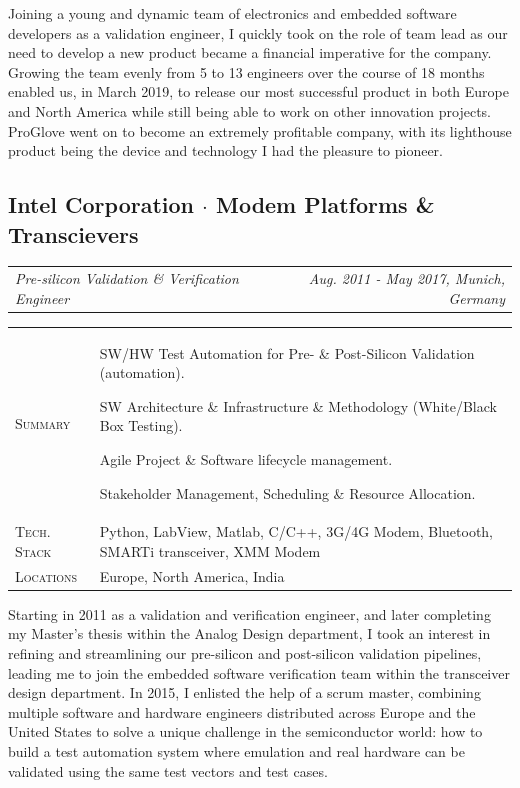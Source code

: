 \documentclass[10pt,a4paper]{moderncv}
\newcommand*{\makecareersubsection}[5]{
  \vspace{0.75em}
  \subsection{#1 {\color{color2}$\cdot$ #2}}
  \addvspace{-0.2em}
  {
    \color{color2}
    \begin{tabularx}{\textwidth}{LR}
      {\itshape #3} & {\itshape #4, #5}
    \end{tabularx}\par
  }
  \addvspace{1.25em}
  }
\begin{document}
  \begin{minipage}{\textwidth}
    \small
    Joining a young and dynamic team of electronics and embedded software developers as a validation engineer, I quickly took on the role of team lead as our need to develop a new product became a financial imperative for the company. Growing the team evenly from 5 to 13 engineers over the course of 18 months enabled us, in March 2019, to release our most successful product in both Europe and North America while still being able to work on other innovation projects. ProGlove went on to become an extremely profitable company, with its lighthouse product being the device and technology I had the pleasure to pioneer.
  \end{minipage}



\makecareersubsection{Intel Corporation}{Modem Platforms \& Transcievers}
  {Pre-silicon Validation \& Verification Engineer}
  {Aug. 2011 - May 2017}
  {Munich, Germany}


  \begin{tabularx}{\textwidth}{>{\scshape}l@{\hskip 3.5mm}L}
    Summary & SW/HW Test Automation for Pre- \& Post-Silicon Validation (automation).
    \par SW Architecture \& Infrastructure \& Methodology (White/Black Box Testing).
    \par Agile Project \& Software lifecycle management. 
    \par Stakeholder Management, Scheduling \& Resource Allocation.\\
    Tech. Stack & Python, LabView, Matlab, C/C++, 3G/4G Modem, Bluetooth, SMARTi transceiver, XMM Modem\\
    Locations & Europe, North America, India\\
  \end{tabularx}

  \vspace{1.5em}
  
  \begin{minipage}{\textwidth}
    \small
    Starting in 2011 as a validation and verification engineer, and later completing my Master's thesis within the Analog Design department, I took an interest in refining and streamlining our pre-silicon and post-silicon validation pipelines, leading me to join the embedded software verification team within the transceiver design department. In 2015, I enlisted the help of a scrum master, combining multiple software and hardware engineers distributed across Europe and the United States to solve a unique challenge in the semiconductor world: how to build a test automation system where emulation and real hardware can be validated using the same test vectors and test cases.
  \end{minipage}
\end{document}
